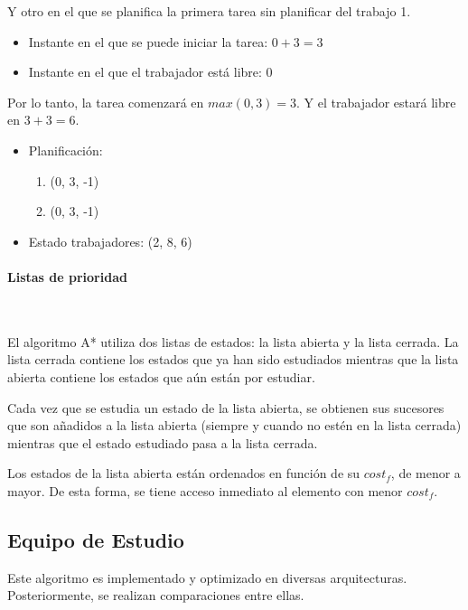 \begin{examplebox}
    Y otro en el que se planifica la primera tarea sin planificar del trabajo 1.
    \begin{itemize}[itemsep=0.25px]
        \item Instante en el que se puede iniciar la tarea: $0 + 3 = 3$
        \item Instante en el que el trabajador está libre: $0$
    \end{itemize}
    Por lo tanto, la tarea comenzará en $max(0, 3) = 3$.
    Y el trabajador estará libre en $3 + 3 = 6$.
    \begin{itemize}[itemsep=0.25px]
        \item Planificación:
        \begin{enumerate}[start=0, itemsep=0.25px]
            \item (0, 3, -1)
            \item (0, 3, -1)
        \end{enumerate}
        \item Estado trabajadores: (2, 8, 6)
    \end{itemize}
 
\end{examplebox}

\paragraph{Listas de prioridad}~

El algoritmo A* utiliza dos listas de estados: la lista abierta y la lista cerrada.
La lista cerrada contiene los estados que ya han sido estudiados mientras que
la lista abierta contiene los estados que aún están por estudiar.

Cada vez que se estudia un estado de la lista abierta,
se obtienen sus sucesores que son añadidos a la lista abierta
(siempre y cuando no estén en la lista cerrada)
mientras que el estado estudiado pasa a la lista cerrada.

Los estados de la lista abierta están ordenados en función de su $cost_f$,
de menor a mayor.
De esta forma, se tiene acceso inmediato al elemento con menor $cost_f$.

\pagebreak

\subsection{Equipo de Estudio}

Este algoritmo es implementado y optimizado en diversas arquitecturas.
Posteriormente, se realizan comparaciones entre ellas.

